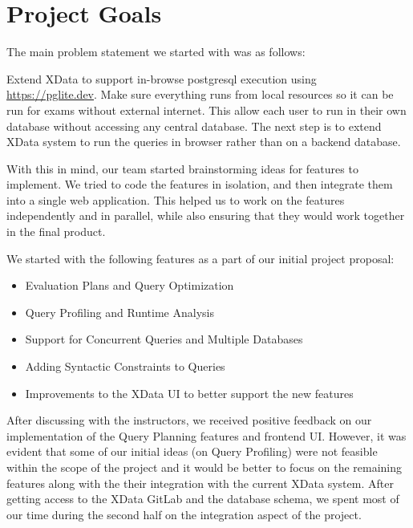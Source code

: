 \documentclass[11pt]{article}
\begin{document}
\newpage

\section{Project Goals}

The main problem statement we started with was as follows:

\begin{tcolorbox}[colframe=blue, colback=white, title=XData Extensions Problem Statement]
Extend XData to support in-browse postgresql execution using \href{https://pglite.dev/}{https://pglite.dev}.  Make sure everything runs from local resources so it can be run for exams without external internet.  This allow each user to run in their own database without accessing any central database.  The next step is to extend XData system to run the queries in browser rather than on a backend database. 
\end{tcolorbox}

With this in mind, our team started brainstorming ideas for features to implement. We tried to code the features in isolation, and then integrate them into a single web application. This helped us to work on the features independently and in parallel, while also ensuring that they would work together in the final product.

\medskip

We started with the following features as a part of our initial project proposal:
\begin{itemize}
    \item Evaluation Plans and Query Optimization
    \item Query Profiling and Runtime Analysis
    \item Support for Concurrent Queries and Multiple Databases
    \item Adding Syntactic Constraints to Queries
    \item Improvements to the XData UI to better support the new features
\end{itemize}

After discussing with the instructors, we received positive feedback on our implementation of the Query Planning features and frontend UI. However, it was evident that some of our initial ideas (on Query Profiling) were not feasible within the scope of the project and it would be better to focus on the remaining features along with the their integration with the current XData system. After getting access to the XData GitLab and the database schema, we spent most of our time during the second half on the integration aspect of the project.
\end{document}

